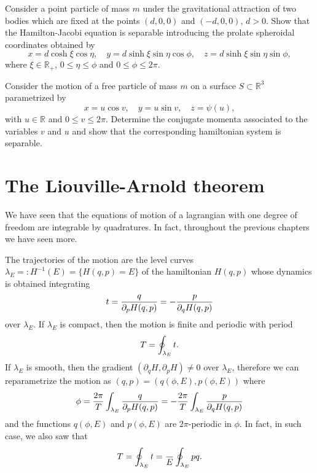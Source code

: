 \documentclass[english,fontsize=11pt,paper=a5,oneside]{scrbook}
\newcommand{\R}{\mathbb{R}}
\let\d\relax
\newcommand{\d}{\mathrm{d}}
\theoremstyle{definition}
\newenvironment{exercise}
  {\pushQED{\qed}\renewcommand{\qedsymbol}{$\maltese$}\exercisex}
  {\popQED\endexercisex}
\begin{document}
\begin{exercise}[Prolate spheroidal coordinates]
  Consider a point particle of mass $m$ under the gravitational attraction of two bodies which are fixed at the points $(d,0,0)$ and $(-d,0,0)$, $d>0$.
  Show that the Hamilton-Jacobi equation is separable introducing the prolate spheroidal coordinates obtained by
  \begin{equation}
    x = d \cosh\xi \cos\eta, \quad
    y = d \sinh\xi \sin\eta \cos\phi, \quad
    z = d \sinh\xi \sin\eta \sin\phi,
  \end{equation}
  where $\xi\in\R_+$, $0\leq\eta\leq\phi$ and $0\leq\phi\leq 2\pi$.
\end{exercise}

\begin{exercise}
  Consider the motion of a free particle of mass $m$ on a surface $S\subset\R^3$ parametrized by
  \begin{equation}
    x = u \cos v, \quad
    y = u \sin v, \quad
    z = \psi(u),
  \end{equation}
  with $u\in\R$ and $0\leq v\leq 2\pi$.
  Determine the conjugate momenta associated to the variables $v$ and $u$ and show that the corresponding hamiltonian system is separable.
\end{exercise}

\section{The Liouville-Arnold theorem}\label{sec:intsys}

We have seen that the equations of motion of a lagrangian with one degree of freedom are integrable by quadratures.
In fact, throughout the previous chapters we have seen more.

The trajectories of the motion are the level curves $\lambda_E =: H^{-1}(E) = \{H(q,p) = E\}$ of the hamiltonian $H(q,p)$ whose dynamics is obtained integrating
\begin{equation}
  \d t = \frac{\d q}{\partial_p H(q,p)} = - \frac{\d p}{\partial_q H(q,p)}
\end{equation}
over $\lambda_E$.
If $\lambda_E$ is compact, then the motion is finite and periodic with period
\begin{equation}
  T = \oint_{\lambda_E}\d t.
\end{equation}
If $\lambda_E$ is smooth, then the gradient $(\partial_q H, \partial_p H)\neq 0$ over $\lambda_E$, therefore we can reparametrize the motion as $(q,p) = (q(\phi, E), p(\phi, E))$ where
\begin{equation}\label{eq:phirep1d}
  \phi = \frac{2\pi}{T}\int_{\lambda_E} \frac{\d q}{\partial_p H(q,p)} = -\frac{2\pi}{T}\int_{\lambda_E} \frac{\d p}{\partial_q H(q,p)}
\end{equation}
and the functions $q(\phi, E)$ and $p(\phi, E)$ are $2\pi$-periodic in $\phi$.
In fact, in such case, we also saw that
\begin{equation}
  T = \oint_{\lambda_E}\d t = \frac{\d}{\d E} \oint_{\lambda_E} p\d q.
\end{equation}
\end{document}
